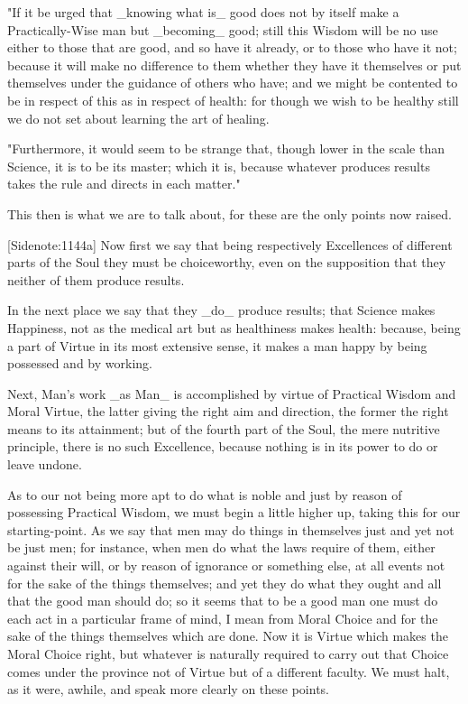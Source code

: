 "If it be urged that _knowing what is_ good does not by itself make a
Practically-Wise man but _becoming_ good; still this Wisdom will be no
use either to those that are good, and so have it already, or to those
who have it not; because it will make no difference to them whether they
have it themselves or put themselves under the guidance of others who
have; and we might be contented to be in respect of this as in respect
of health: for though we wish to be healthy still we do not set about
learning the art of healing.

"Furthermore, it would seem to be strange that, though lower in the
scale than Science, it is to be its master; which it is, because
whatever produces results takes the rule and directs in each matter."

This then is what we are to talk about, for these are the only points
now raised.

[Sidenote:1144a] Now first we say that being respectively Excellences
of different parts of the Soul they must be choiceworthy, even on the
supposition that they neither of them produce results.

In the next place we say that they _do_ produce results; that Science
makes Happiness, not as the medical art but as healthiness makes health:
because, being a part of Virtue in its most extensive sense, it makes a
man happy by being possessed and by working.

Next, Man's work _as Man_ is accomplished by virtue of Practical Wisdom
and Moral Virtue, the latter giving the right aim and direction, the
former the right means to its attainment; but of the fourth part of the
Soul, the mere nutritive principle, there is no such Excellence, because
nothing is in its power to do or leave undone.

As to our not being more apt to do what is noble and just by reason of
possessing Practical Wisdom, we must begin a little higher up, taking
this for our starting-point. As we say that men may do things in
themselves just and yet not be just men; for instance, when men do what
the laws require of them, either against their will, or by reason of
ignorance or something else, at all events not for the sake of the
things themselves; and yet they do what they ought and all that the good
man should do; so it seems that to be a good man one must do each act in
a particular frame of mind, I mean from Moral Choice and for the sake of
the things themselves which are done. Now it is Virtue which makes the
Moral Choice right, but whatever is naturally required to carry out
that Choice comes under the province not of Virtue but of a different
faculty. We must halt, as it were, awhile, and speak more clearly on
these points.

